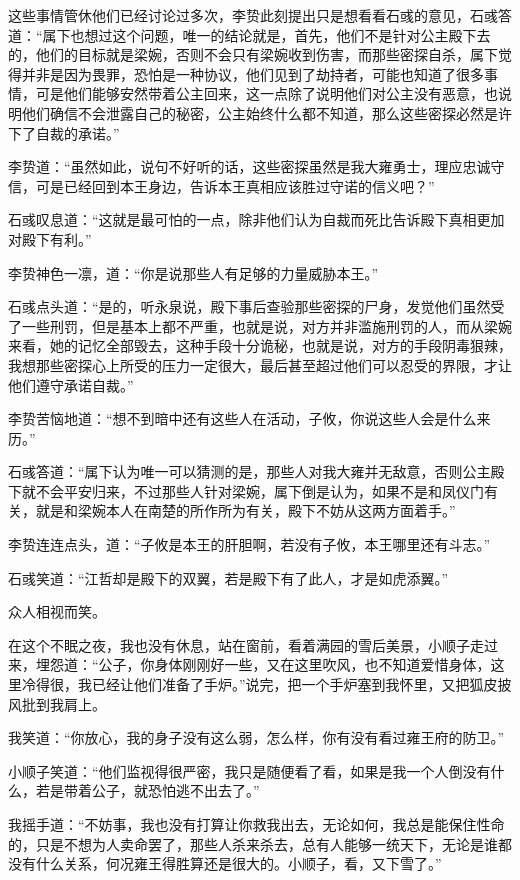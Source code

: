 这些事情管休他们已经讨论过多次，李贽此刻提出只是想看看石彧的意见，石彧答道：“属下也想过这个问题，唯一的结论就是，首先，他们不是针对公主殿下去的，他们的目标就是梁婉，否则不会只有梁婉收到伤害，而那些密探自杀，属下觉得并非是因为畏罪，恐怕是一种协议，他们见到了劫持者，可能也知道了很多事情，可是他们能够安然带着公主回来，这一点除了说明他们对公主没有恶意，也说明他们确信不会泄露自己的秘密，公主始终什么都不知道，那么这些密探必然是许下了自裁的承诺。”

李贽道：“虽然如此，说句不好听的话，这些密探虽然是我大雍勇士，理应忠诚守信，可是已经回到本王身边，告诉本王真相应该胜过守诺的信义吧？”

石彧叹息道：“这就是最可怕的一点，除非他们认为自裁而死比告诉殿下真相更加对殿下有利。”

李贽神色一凛，道：“你是说那些人有足够的力量威胁本王。”

石彧点头道：“是的，听永泉说，殿下事后查验那些密探的尸身，发觉他们虽然受了一些刑罚，但是基本上都不严重，也就是说，对方并非滥施刑罚的人，而从梁婉来看，她的记忆全部毁去，这种手段十分诡秘，也就是说，对方的手段阴毒狠辣，我想那些密探心上所受的压力一定很大，最后甚至超过他们可以忍受的界限，才让他们遵守承诺自裁。”

李贽苦恼地道：“想不到暗中还有这些人在活动，子攸，你说这些人会是什么来历。”

石彧答道：“属下认为唯一可以猜测的是，那些人对我大雍并无敌意，否则公主殿下就不会平安归来，不过那些人针对梁婉，属下倒是认为，如果不是和凤仪门有关，就是和梁婉本人在南楚的所作所为有关，殿下不妨从这两方面着手。”

李贽连连点头，道：“子攸是本王的肝胆啊，若没有子攸，本王哪里还有斗志。”

石彧笑道：“江哲却是殿下的双翼，若是殿下有了此人，才是如虎添翼。”

众人相视而笑。

在这个不眠之夜，我也没有休息，站在窗前，看着满园的雪后美景，小顺子走过来，埋怨道：“公子，你身体刚刚好一些，又在这里吹风，也不知道爱惜身体，这里冷得很，我已经让他们准备了手炉。”说完，把一个手炉塞到我怀里，又把狐皮披风批到我肩上。

我笑道：“你放心，我的身子没有这么弱，怎么样，你有没有看过雍王府的防卫。”

小顺子笑道：“他们监视得很严密，我只是随便看了看，如果是我一个人倒没有什么，若是带着公子，就恐怕逃不出去了。”

我摇手道：“不妨事，我也没有打算让你救我出去，无论如何，我总是能保住性命的，只是不想为人卖命罢了，那些人杀来杀去，总有人能够一统天下，无论是谁都没有什么关系，何况雍王得胜算还是很大的。小顺子，看，又下雪了。”


